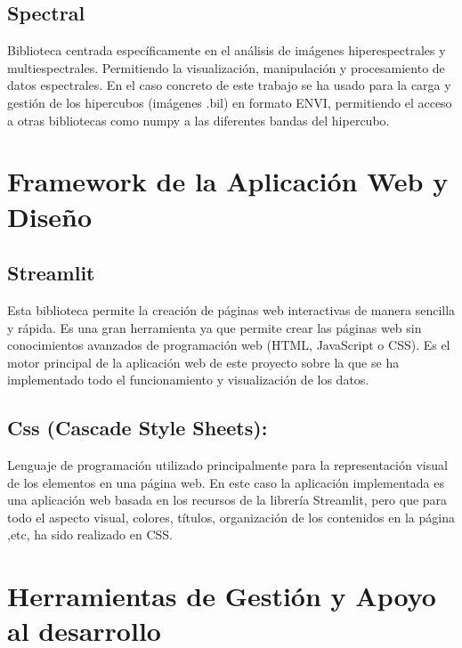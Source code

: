 \subsection{Spectral}
Biblioteca centrada específicamente en el análisis de imágenes hiperespectrales y multiespectrales. Permitiendo la visualización, manipulación y procesamiento de datos espectrales. En el caso concreto de este trabajo se ha usado para la carga y gestión de los hipercubos (imágenes .bil) en formato ENVI, permitiendo el acceso a otras bibliotecas como numpy a las diferentes bandas del hipercubo\cite{SpectralPython}.

\section{Framework de la Aplicación Web y Diseño}

 \subsection{Streamlit}
Esta biblioteca permite la creación de páginas web interactivas de manera sencilla y rápida. Es una gran herramienta ya que permite crear las páginas web sin conocimientos avanzados de programación web (HTML, JavaScript o CSS). Es el motor principal de la aplicación web de este proyecto sobre la que se ha implementado todo el funcionamiento y visualización de los datos\cite{Streamlit}.


 \subsection{Css (Cascade Style Sheets):} 
Lenguaje de programación utilizado principalmente para la representación visual de los elementos en una página web\cite{alvarez2017manual}. En este caso la aplicación implementada es una aplicación web basada en los recursos de la librería Streamlit, pero que para todo el aspecto visual, colores, títulos, organización de los contenidos en la página ,etc, ha sido realizado en CSS.


\section{Herramientas de Gestión y Apoyo al desarrollo}

